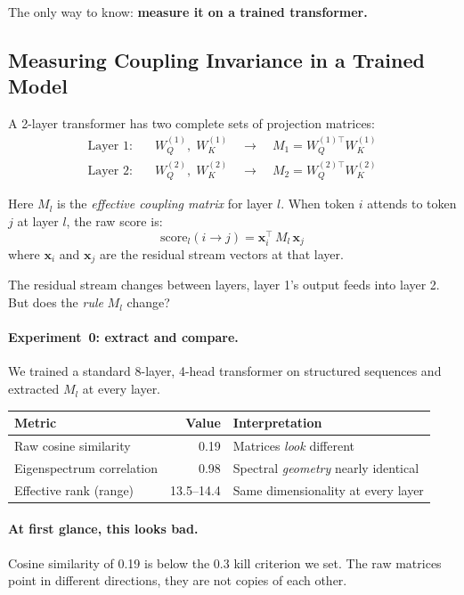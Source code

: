 \documentclass[11pt, a4paper]{article}
\newcommand{\x}{\mathbf{x}}
\theoremstyle{remark}
\begin{document}
The only way to know: \textbf{measure it on a trained transformer.}

\subsection{Measuring Coupling Invariance in a Trained Model}
\label{sec:grn:exp0}

A 2-layer transformer has two complete sets of projection matrices:
\begin{align*}
\text{Layer 1:} \quad & W_Q^{(1)}, \; W_K^{(1)} \quad \longrightarrow \quad M_1 = W_Q^{(1)\top} W_K^{(1)} \\
\text{Layer 2:} \quad & W_Q^{(2)}, \; W_K^{(2)} \quad \longrightarrow \quad M_2 = W_Q^{(2)\top} W_K^{(2)}
\end{align*}

Here $M_l$ is the \emph{effective coupling matrix} for layer $l$.
When token $i$ attends to token $j$ at layer $l$, the raw score is:
\[
\text{score}_l(i \to j) = \x_i^\top \, M_l \, \x_j
\]
where $\x_i$ and $\x_j$ are the residual stream vectors at that layer.

The residual stream changes between layers, layer 1's output feeds into layer 2.
But does the \emph{rule} $M_l$ change?

\paragraph{Experiment~0: extract and compare.}
We trained a standard 8-layer, 4-head transformer on structured sequences and extracted $M_l$ at every layer.

\begin{center}\small
\renewcommand{\arraystretch}{1.2}
\begin{tabular}{@{}lrl@{}}
\toprule
\textbf{Metric} & \textbf{Value} & \textbf{Interpretation} \\
\midrule
Raw cosine similarity & 0.19 & Matrices \emph{look} different \\
Eigenspectrum correlation & 0.98 & Spectral \emph{geometry} nearly identical \\
Effective rank (range) & 13.5--14.4 & Same dimensionality at every layer \\
\bottomrule
\end{tabular}
\end{center}

\paragraph{At first glance, this looks bad.}
Cosine similarity of 0.19 is below the 0.3 kill criterion we set.
The raw matrices point in different directions, they are not copies of each other.
\end{document}
